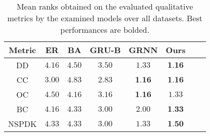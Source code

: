 \begin{table}[h!]
    \footnotesize
    \centering
    \caption{Mean ranks obtained on the evaluated qualitative metrics by the examined models over all datasets. Best performances are bolded.}
    \label{tab:graph-qualitative-rank}
    \renewcommand{\arraystretch}{1.2}
    \begin{tabular}{cccccccc}
          \toprule
          \textbf{Metric} & \textbf{ER} & \textbf{BA} & \textbf{GRU-B} & \textbf{GRNN} & \textbf{Ours} \\
          \midrule
          DD    & $4.16$ & $4.50$ & $3.50$ & $1.33$ & $\textbf{1.16}$\\
          CC    & $3.00$ & $4.83$ & $2.83$ & $\textbf{1.16}$ & $\textbf{1.16}$\\
          OC    & $4.50$ & $4.16$ & $3.16$ & $\textbf{1.16}$ & $1.33$\\
          BC    & $4.16$ & $4.33$ & $3.00$ & $2.00$ & $\textbf{1.33}$\\
          NSPDK & $4.33$ & $4.33$ & $3.00$ & $1.33$ & $\textbf{1.50}$\\
          \bottomrule
    \end{tabular}
\end{table}
